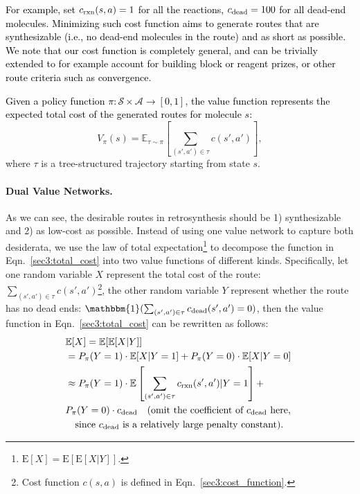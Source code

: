 \documentclass[nohyperref]{article}
\theoremstyle{plain}
\theoremstyle{definition}
\theoremstyle{remark}
\begin{document}
\textcolor{black}{For example, \citep{simulated_experience} set $c_{\rm rxn}(s,a) = 1$ for all the reactions, $c_{\rm dead} =100$ for all dead-end molecules. Minimizing such cost function aims to generate routes that are synthesizable (i.e., no dead-end molecules in the route) and as short as possible. We note that our cost function is completely general, and can be trivially extended to for example account for building block or reagent prizes, or other route criteria such as convergence.
}

\textcolor{black}{
Given a policy function $\pi: \mathcal{S} \times \mathcal{A} \rightarrow [0, 1]$, the value function represents the expected total cost of the generated routes for molecule $s$:
}
\begin{equation}
    V_{\pi}(s) = \mathbb{E}_{\tau\sim\pi} \left[\sum_{(s', a')\in\tau} c(s', a') \right],
\label{sec3:total_cost}
\end{equation}
where $\tau$ is a tree-structured trajectory starting from state $s$.





\paragraph{Dual Value Networks.}
As we can see, the desirable routes in retrosynthesis should be 1) synthesizable and 2) as low-cost as possible.
Instead of using one value network to capture both desiderata, we use the law of total expectation\footnote{$\text{E}[X] = \text{E}[\text{E}[X|Y]]$.} to decompose the function in Eqn.~\ref{sec3:total_cost} into two value functions of different kinds. Specifically,
let one random variable $X$ represent the total cost of the route: $\sum_{(s', a')\in\tau} c(s', a')$\footnote{Cost function $c(s,a)$ is defined in Eqn.~\ref{sec3:cost_function}.}, 
the other random variable $Y$ represent whether the route has no dead ends:  $\mathbbm{1}(\sum_{(s', a')\in\tau}{c_{\rm dead}(s', a') = 0)}$,
then the value function in Eqn.~\ref{sec3:total_cost} can be rewritten as follows:
\begin{equation}
\label{sec3:decomposition}
\begin{aligned}
&\mathbb{E}[X] = \mathbb{E}[\mathbb{E}[X|Y]] \\
    &= P_{\pi}(Y=1)\cdot\mathbb{E}[X|Y=1] +  P_{\pi}(Y=0)\cdot\mathbb{E}[X|Y=0] \\
    &\approx P_{\pi}(Y=1)\cdot\mathbb{E}\left[\sum_{(s', a')\in\tau} c_{\rm rxn}(s', a')|Y=1 \right] + \\ 
    &  P_{\pi}(Y=0)\cdot c_{\rm dead} 
    \quad \text{(omit the coefficient of $c_{\rm dead}$ here, } \\
    & \quad \text{since $c_{\rm dead}$ is a relatively large penalty constant).}
\end{aligned}
\end{equation}
\end{document}
